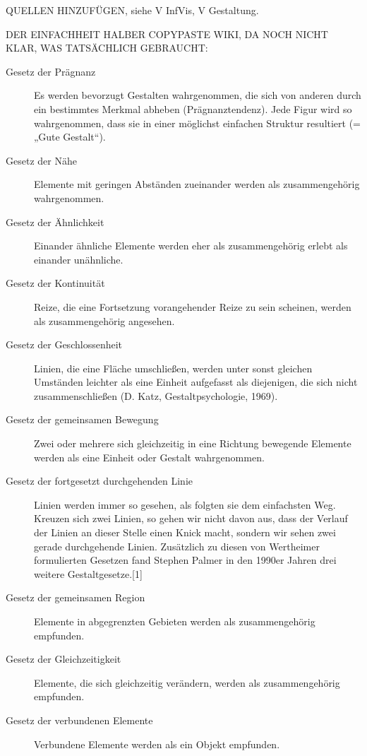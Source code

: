 QUELLEN HINZUFÜGEN,  siehe V InfVis, V Gestaltung.

DER EINFACHHEIT HALBER COPYPASTE WIKI, DA NOCH NICHT KLAR, WAS TATSÄCHLICH GEBRAUCHT:
\begin{description}
\item [Gesetz der Prägnanz]
Es werden bevorzugt Gestalten wahrgenommen, die sich von anderen durch ein bestimmtes Merkmal abheben (Prägnanztendenz). Jede Figur wird so wahrgenommen, dass sie in einer möglichst einfachen Struktur resultiert (= „Gute Gestalt“).
\item [Gesetz der Nähe]
Elemente mit geringen Abständen zueinander werden als zusammengehörig wahrgenommen.
\item [Gesetz der Ähnlichkeit]
Einander ähnliche Elemente werden eher als zusammengehörig erlebt als einander unähnliche.
\item [Gesetz der Kontinuität]
Reize, die eine Fortsetzung vorangehender Reize zu sein scheinen, werden als zusammengehörig angesehen.
\item [Gesetz der Geschlossenheit]
Linien, die eine Fläche umschließen, werden unter sonst gleichen Umständen leichter als eine Einheit aufgefasst als diejenigen, die sich nicht zusammenschließen (D. Katz, Gestaltpsychologie, 1969).
\item [Gesetz der gemeinsamen Bewegung]
Zwei oder mehrere sich gleichzeitig in eine Richtung bewegende Elemente werden als eine Einheit oder Gestalt wahrgenommen.
\item [Gesetz der fortgesetzt durchgehenden Linie]
Linien werden immer so gesehen, als folgten sie dem einfachsten Weg. Kreuzen sich zwei Linien, so gehen wir nicht davon aus, dass der Verlauf der Linien an dieser Stelle einen Knick macht, sondern wir sehen zwei gerade durchgehende Linien.
Zusätzlich zu diesen von Wertheimer formulierten Gesetzen fand Stephen Palmer in den 1990er Jahren drei weitere Gestaltgesetze.[1]

\item [Gesetz der gemeinsamen Region]
Elemente in abgegrenzten Gebieten werden als zusammengehörig empfunden.
\item [Gesetz der Gleichzeitigkeit]
Elemente, die sich gleichzeitig verändern, werden als zusammengehörig empfunden.
\item [Gesetz der verbundenen Elemente]
Verbundene Elemente werden als ein Objekt empfunden.
\end{description}

